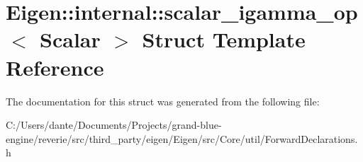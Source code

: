\hypertarget{struct_eigen_1_1internal_1_1scalar__igamma__op}{}\section{Eigen\+::internal\+::scalar\+\_\+igamma\+\_\+op$<$ Scalar $>$ Struct Template Reference}
\label{struct_eigen_1_1internal_1_1scalar__igamma__op}


The documentation for this struct was generated from the following file\+:\begin{DoxyCompactItemize}
\item 
C\+:/\+Users/dante/\+Documents/\+Projects/grand-\/blue-\/engine/reverie/src/third\+\_\+party/eigen/\+Eigen/src/\+Core/util/Forward\+Declarations.\+h\end{DoxyCompactItemize}
